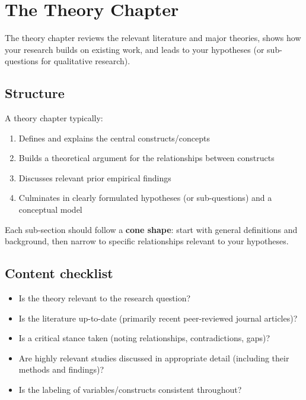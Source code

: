 \documentclass[
  11pt,
  a4paper,
]{scrbook}
\providecommand{\tightlist}{%
  \setlength{\itemsep}{0pt}\setlength{\parskip}{0pt}}\usepackage{longtable,booktabs,array}
\begin{document}
\section{The Theory Chapter}\label{the-theory-chapter}

The theory chapter reviews the relevant literature and major theories,
shows how your research builds on existing work, and leads to your
hypotheses (or sub-questions for qualitative research).

\subsection{Structure}\label{structure}

A theory chapter typically:

\begin{enumerate}
\def\labelenumi{\arabic{enumi}.}
\tightlist
\item
  Defines and explains the central constructs/concepts
\item
  Builds a theoretical argument for the relationships between constructs
\item
  Discusses relevant prior empirical findings
\item
  Culminates in clearly formulated hypotheses (or sub-questions) and a
  conceptual model
\end{enumerate}

Each sub-section should follow a \textbf{cone shape}: start with general
definitions and background, then narrow to specific relationships
relevant to your hypotheses.

\subsection{Content checklist}\label{content-checklist}

\begin{itemize}
\tightlist
\item[$\square$]
  Is the theory relevant to the research question?
\item[$\square$]
  Is the literature up-to-date (primarily recent peer-reviewed journal
  articles)?
\item[$\square$]
  Is a critical stance taken (noting relationships, contradictions,
  gaps)?
\item[$\square$]
  Are highly relevant studies discussed in appropriate detail (including
  their methods and findings)?
\item[$\square$]
  Is the labeling of variables/constructs consistent throughout?
\end{itemize}
\end{document}
